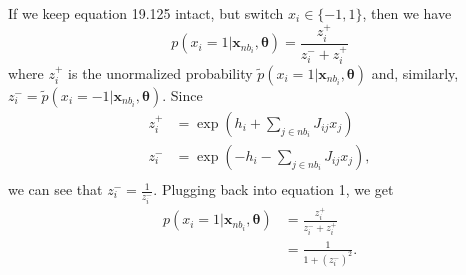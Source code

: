 \documentclass[a4paper,11pt]{article}
\begin{document}
  If we keep equation 19.125 intact, but switch $x_i \in \{-1, 1\}$, then we have
  \begin{equation}
    p(x_i=1|\mathbf{x}_{nb_i}, \boldsymbol{\theta}) = \frac{ z_i^+ }{z_i^- + z_i^+}
  \end{equation}
  where $z_i^+$ is the unormalized probability
  $\tilde{p}(x_i=1|\mathbf{x}_{nb_i}, \boldsymbol{\theta})$ and, similarly,
  $z_i^- = \tilde{p}(x_i=-1|\mathbf{x}_{nb_i}, \boldsymbol{\theta})$.
  Since 
  \begin{align*}
    z_i^+ &= \exp\left(h_i + \sum\limits_{j\in nb_i} J_{ij}x_j\right) \\
    z_i^- &= \exp\left(-h_i - \sum\limits_{j\in nb_i} J_{ij}x_j\right), \\
  \end{align*}
  we can see that $z_i^- = \frac{1}{z_i^-}$. Plugging back into equation 1, we get
  \begin{align*}
    p(x_i=1|\mathbf{x}_{nb_i}, \boldsymbol{\theta}) &= \frac{z_i^+}{z_i^- + z_i^+} \\
    &= \frac{1}{1 + (z_i^-)^2}.
  \end{align*}
\end{document}
